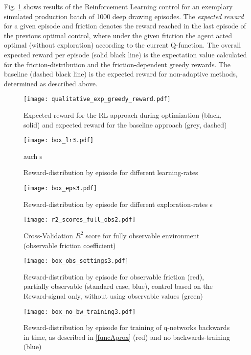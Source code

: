 Fig. \ref{ExpGreedyReward} shows results of the Reinforcement Learning control for an exemplary simulated production batch of 1000 deep drawing episodes. The \textit{expected reward} for a given episode and friction denotes the reward reached in the last episode of the previous optimal control, where under the given friction the agent acted optimal (without exploration) according to the current Q-function. The overall expected reward per episode (solid black line) is the expectation value calculated for the friction-distribution and the friction-dependent greedy rewards. The baseline (dashed black line) is the expected reward for non-adaptive methods, determined as described above.
\begin{figure}
	\texttt{[image: qualitative\_exp\_greedy\_reward.pdf]}
	\caption{Expected reward for the RL approach during optimization (black, solid) and expected reward for the baseline approach (grey, dashed)}
	\label{ExpGreedyReward}
\end{figure}

\begin{figure}
	\texttt{[image: box\_lr3.pdf]}
	\caption{Reward-distribution by episode for different learning-rates} auch s
	\label{boxLR}
\end{figure}

\begin{figure}
	\texttt{[image: box\_eps3.pdf]}
	\caption{Reward-distribution by episode for different exploration-rates $\epsilon$}
	\label{boxEPS}
\end{figure}

\begin{figure}
	\texttt{[image: r2\_scores\_full\_obs2.pdf]}
	\caption{Cross-Validation $R^2$ score for fully observable environment (observable friction coefficient)}
	\label{r2_fully_obs}
\end{figure}


\begin{figure}
	\texttt{[image: box\_obs\_settings3.pdf]}
	\caption{Reward-distribution by episode for observable friction (red), partially observable (standard case, blue), control based on the Reward-signal only, without using observable values (green)}
	\label{obs_partObs_fullObs}
\end{figure}


\begin{figure}
	\texttt{[image: box\_no\_bw\_training3.pdf]}
	\caption{Reward-distribution by episode for training of q-networks backwards in time, as described in \ref{funcAprox} (red) and no backwards-training (blue)}
	\label{backwards_training}
\end{figure}

